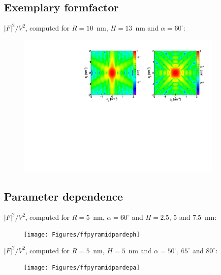 \subsection{Exemplary formfactor}
$|F|^2/V^2$, computed for $R=10$~nm, $H=13$~nm and $\alpha=60^{\circ}$:
\begin{figure}[h]
\begin{center}
\includegraphics[width=0.9\textwidth]{Figures/figffpyramid}
\end{center}
\end{figure}

\par

\subsection{Parameter dependence}
$|F|^2/V^2$, computed for $R=5$~nm, $\alpha=60^{\circ}$ and $H=2.5$, 5 and 7.5~nm:
\begin{figure}[h]
\begin{center}
\texttt{[image: Figures/ffpyramidpardeph]}
\end{center}
\end{figure}
\FloatBarrier

$|F|^2/V^2$, computed for $R=5$~nm, $H=5$~nm and $\alpha=50^{\circ}$, $65^{\circ}$ and $80^{\circ}$:
\begin{figure}[h]
\begin{center}
\texttt{[image: Figures/ffpyramidpardepa]}
\end{center}
\end{figure}
\FloatBarrier

